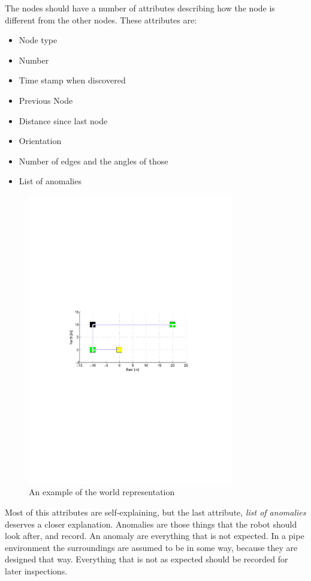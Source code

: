 The nodes should have a number of attributes describing how the node is different from the
other nodes. These attributes are:
\begin{itemize}
    \item Node type
    \item Number
    \item Time stamp when discovered
    \item Previous Node
    \item Distance since last node
    \item Orientation
    \item Number of edges and the angles of those
    \item List of anomalies
\end{itemize}

\begin{figure}[htbp]
    \centering
    \includegraphics[width=0.8\textwidth]{pics/worldrepresentation}
    \caption{An example of the world representation}
    \label{chap5:fig-worldrepresentation}
\end{figure}
Most of this attributes are self-explaining, but the last attribute, \emph{list of
anomalies} deserves a closer explanation. 
Anomalies are those things that the robot should look after, and record. An anomaly are
everything that is not expected. In a pipe environment the surroundings are assumed to be
in some way, because they are designed that way. Everything that is not as expected should
be recorded for later inspections. 

